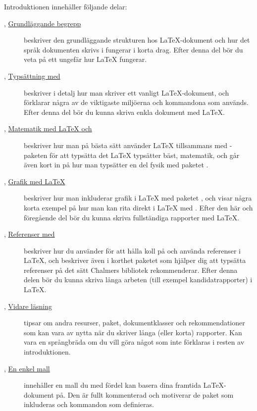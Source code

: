 \documentclass[lang=sv,ptsize=10pt,font=none,nomath,titles=bf,../../a4.tex]{subfiles}
\begin{document}
Introduktionen innehåller följande delar:
\begin{description}
	\item[{, \hyperref[sec:1]{Grundläggande begrepp}}]
	beskriver den grundläggande strukturen hos \LaTeX-dokument och hur det
	språk dokumenten skrivs i fungerar i korta drag. Efter denna del bör
	du veta på ett ungefär hur \LaTeX{} fungerar.
	
	\item[{, \hyperref[sec:2]{Typsättning med \pdfLaTeX}}]
	beskriver i detalj hur man skriver ett vanligt
	\LaTeX-dokument, och förklarar några av de viktigaste miljöerna
	och kommandona som används. Efter denna del bör du kunna skriva enkla
	dokument med \LaTeX.
	
	\item[{, \hyperref[sec:3]{Matematik med \LaTeX{} och 
	\AmS}}]
	beskriver hur man på bästa sätt använder \LaTeX{} tillsammans med
	\AmS-paketen för att typsätta det \LaTeX{} typsätter bäst, matematik,
	och går även kort in på hur man typsätter en del fysik med paketet
	.
	
	\item[{, \hyperref[sec:4]{Grafik med \LaTeX}}]
	beskriver hur man inkluderar grafik i \LaTeX{} med paketet
	, och visar några korta exempel på hur man kan rita
	direkt i \LaTeX{} med \PGFTikZ{}. Efter den här och föregående del bör
	du kunna skriva fullständiga rapporter med \LaTeX.
	
	\item[{, \hyperref[sec:5]{Referenser med \BibTeX}}]
	beskriver hur du använder \BibTeX{} för att hålla koll på och använda
	referenser i \LaTeX, och beskriver även i korthet paketet  som
	hjälper dig att typsätta referenser på det sätt Chalmers bibliotek
	rekommenderar. Efter denna delen bör du kunna skriva långa arbeten
	(till exempel kandidatrapporter) i \LaTeX.
	
	\item[{, \hyperref[sec:6]{Vidare läsning}}]
	tipsar om andra resurser, paket, dokumentklasser och rekommendationer
	som kan vara av nytta när du skriver långa (eller korta) rapporter.
	Kan vara en språngbräda om du vill göra något som inte förklaras i
	resten av introduktionen.
	
	\item[, {\hyperref[app:1]{En enkel mall}}]
	innehåller en mall du med fördel kan basera dina framtida 
	\LaTeX{}-dokument
	på. Den är fullt kommenterad och motiverar de paket som inkluderas och
	kommandon som definieras.
\end{description}
\end{document}
